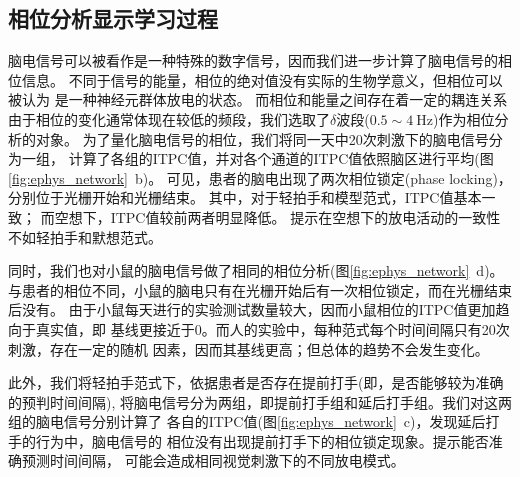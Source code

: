 \subsection{相位分析显示学习过程}
脑电信号可以被看作是一种特殊的数字信号，因而我们进一步计算了脑电信号的相位信息。
不同于信号的能量，相位的绝对值没有实际的生物学意义，但相位可以被认为
是一种神经元群体放电的状态\cite{gu2010phase}。
而相位和能量之间存在着一定的耦连关系\cite{watrous2015phase,demiralp2007gamma}
由于相位的变化通常体现在较低的频段，我们选取了\(\delta\)波段(\(0.5 \sim 4\ \text{Hz}\))作为相位分析的对象。
为了量化脑电信号的相位，我们将同一天中20次刺激下的脑电信号分为一组，
计算了各组的ITPC值，并对各个通道的ITPC值依照脑区进行平均(图\ref{fig:ephys_network}~b)。
可见，患者的脑电出现了两次相位锁定(phase locking)，分别位于光栅开始和光栅结束。
其中，对于轻拍手和模型范式，ITPC值基本一致；
而空想下，ITPC值较前两者明显降低。%
提示在空想下的放电活动的一致性不如轻拍手和默想范式。

同时，我们也对小鼠的脑电信号做了相同的相位分析(图\ref{fig:ephys_network}~d)。
与患者的相位不同，小鼠的脑电只有在光栅开始后有一次相位锁定，而在光栅结束后没有。
由于小鼠每天进行的实验测试数量较大，因而小鼠相位的ITPC值更加趋向于真实值，即
基线更接近于0。而人的实验中，每种范式每个时间间隔只有20次刺激，存在一定的随机
因素，因而其基线更高；但总体的趋势不会发生变化。

此外，我们将轻拍手范式下，依据患者是否存在提前打手(即，是否能够较为准确的预判时间间隔),
将脑电信号分为两组，即提前打手组和延后打手组。我们对这两组的脑电信号分别计算了
各自的ITPC值(图\ref{fig:ephys_network}~c)，发现延后打手的行为中，脑电信号的
相位没有出现提前打手下的相位锁定现象。提示能否准确预测时间间隔，
可能会造成相同视觉刺激下的不同放电模式。

